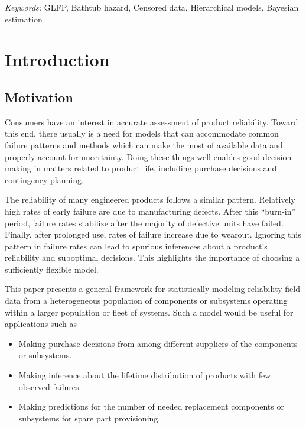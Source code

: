 \documentclass[12pt]{article}
\begin{document}

\noindent%
{\it Keywords:} GLFP, Bathtub hazard, Censored data, Hierarchical models, Bayesian estimation
\vfill

\newpage
{} %


\section{Introduction}
\subsection{Motivation}
Consumers have an interest in accurate assessment of product reliability. Toward this end, there usually is a need for models that can accommodate common failure patterns and methods which can make the most of available data and properly account for uncertainty. Doing these things well enables good decision-making in matters related to product life, including purchase decisions and contingency planning.

The reliability of many engineered products follows a similar pattern. Relatively high rates of early failure are due to manufacturing defects.  After this ``burn-in'' period, failure rates stabilize after the majority of defective units have failed.  Finally, after prolonged use, rates of failure increase due to wearout.  Ignoring this pattern in failure rates can lead to spurious inferences about a product's reliability and suboptimal decisions. This highlights the importance of choosing a sufficiently flexible model.



This paper presents a general framework for statistically modeling reliability field data from a heterogeneous population of components or subsystems operating within a larger population or fleet of systems. Such a model would be useful for applications such as

\begin{itemize}
\item Making purchase decisions from among different suppliers of the components or subsystems.
\item Making inference about the lifetime distribution of products with few observed failures.
\item Making predictions for the number of needed replacement components or subsystems for spare part provisioning.
\end{itemize}
\end{document}
